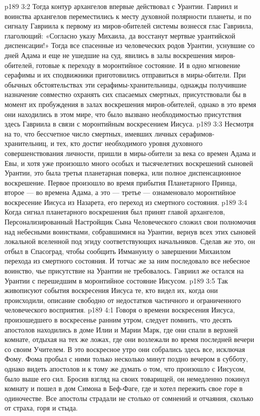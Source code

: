 \vs p189 3:2 Тогда контур архангелов впервые действовал с Урантии. Гавриил и воинства архангелов переместились к месту духовной полярности планеты, и по сигналу Гавриила к первому из миров\hyp{}обителей системы вознесся глас Гавриила, глаголющий: «Согласно указу Михаила, да восстанут мертвые урантийской диспенсации!» Тогда все спасенные из человеческих родов Урантии, уснувшие со дней Адама и еще не ушедшие на суд, явились в залы воскрешения миров\hyp{}обителей, готовые к переходу в моронтийное состояние. И в одно мгновение серафимы и их сподвижники приготовились отправиться в миры\hyp{}обители. При обычных обстоятельствах эти серафимы\hyp{}хранительницы, однажды получившие назначение совместно охранять сих спасаемых смертных, присутствовали бы в момент их пробуждения в залах воскрешения миров\hyp{}обителей, однако в это время они находились в этом мире, что было вызвано необходимостью присутствия здесь Гавриила в связи с моронтийным воскресением Иисуса.
\vs p189 3:3 Несмотря на то, что бессчетное число смертных, имевших личных серафимов\hyp{}хранительниц, и тех, кто достиг необходимого уровня духовного совершенствования личности, пришли в миры\hyp{}обители за века со времен Адама и Евы, и хотя уже произошло много особых и тысячелетних воскрешений сыновей Урантии, это была третья планетарная поверка, или полное диспенсационное воскрешение. Первое произошло во время прибытия Планетарного Принца, второе --- во времена Адама, а это --- третье --- ознаменовало моронтийное воскресение Иисуса из Назарета, его переход из смертного состояния.
\vs p189 3:4 \pc Когда сигнал планетарного воскрешения был принят главой архангелов, Персонализированный Настройщик Сына Человеческого сложил свои полномочия над небесными воинствами, собравшимися на Урантии, вернув всех этих сыновей локальной вселенной под эгиду соответствующих начальников. Сделав же это, он отбыл в Спасоград, чтобы сообщить Иммануилу о завершении Михаилом перехода из смертного состояния. И тотчас же за ним последовало все небесное воинство, чье присутствие на Урантии не требовалось. Гавриил же остался на Урантии с перешедшим в моронтийное состояние Иисусом.
\vs p189 3:5 \pc Так живописуют события воскресения Иисуса те, кто видел их, когда они происходили, описание свободно от недостатков частичного и ограниченного человеческого восприятия.
\vs p189 4:1 Говоря о времени воскресения Иисуса, произошедшего в воскресенье ранним утром, следует помнить, что десять апостолов находились в доме Илии и Марии Марк, где они спали в верхней комнате, отдыхая на тех же ложах, где они возлежали во время последней вечери со своим Учителем. В это воскресное утро они собрались здесь все, исключая Фому. Фома пробыл с ними только несколько минут поздно вечером в субботу, однако видеть апостолов и к тому же думать о том, что произошло с Иисусом, было выше его сил. Бросив взгляд на своих товарищей, он немедленно покинул комнату и пошел в дом Симона в Беф\hyp{}Фаге, где и хотел пережить свое горе в одиночестве. Все апостолы страдали не столько от сомнений и отчаяния, сколько от страха, горя и стыда.
